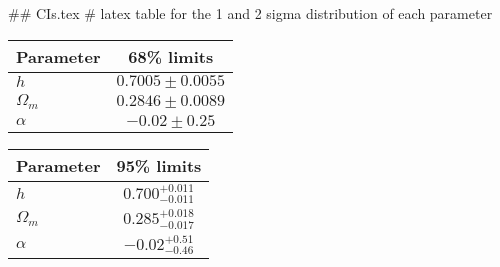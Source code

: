 ## CIs.tex
# latex table for the 1 and 2 sigma distribution of each parameter

\begin{tabular} { l  c}
 Parameter &  68\% limits\\
\hline
{\boldmath$h              $} & $0.7005\pm 0.0055          $\\
{\boldmath$\Omega_m       $} & $0.2846\pm 0.0089          $\\
{\boldmath$\alpha         $} & $-0.02\pm 0.25             $\\
\hline
\end{tabular}

\begin{tabular} { l  c}
 Parameter &  95\% limits\\
\hline
{\boldmath$h              $} & $0.700^{+0.011}_{-0.011}   $\\
{\boldmath$\Omega_m       $} & $0.285^{+0.018}_{-0.017}   $\\
{\boldmath$\alpha         $} & $-0.02^{+0.51}_{-0.46}     $\\
\hline
\end{tabular}
